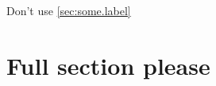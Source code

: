 \documentclass{article}
\begin{document}
Don't use \vref{sec:some.label}

\section{Full section please}\label{sec:some.label}
\end{document}
